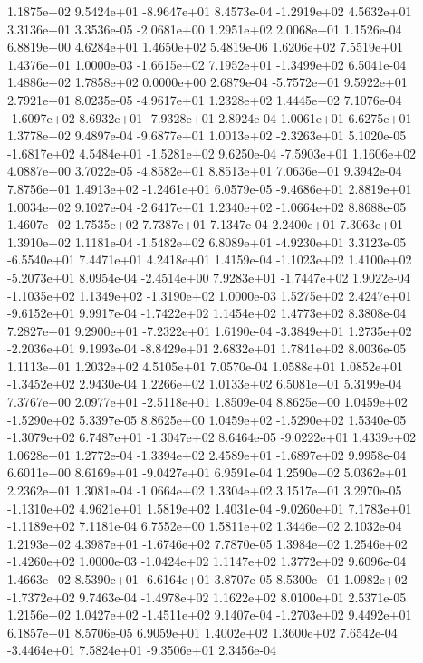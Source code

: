  1.1875e+02  9.5424e+01 -8.9647e+01  8.4573e-04
-1.2919e+02  4.5632e+01  3.3136e+01  3.3536e-05
-2.0681e+00  1.2951e+02  2.0068e+01  1.1526e-04
6.8819e+00 4.6284e+01 1.4650e+02  5.4819e-06
1.6206e+02 7.5519e+01 1.4376e+01  1.0000e-03
-1.6615e+02  7.1952e+01 -1.3499e+02  6.5041e-04
1.4886e+02 1.7858e+02 0.0000e+00  2.6879e-04
-5.7572e+01  9.5922e+01  2.7921e+01  8.0235e-05
-4.9617e+01  1.2328e+02  1.4445e+02  7.1076e-04
-1.6097e+02  8.6932e+01 -7.9328e+01  2.8924e-04
1.0061e+01 6.6275e+01 1.3778e+02  9.4897e-04
-9.6877e+01  1.0013e+02 -2.3263e+01  5.1020e-05
-1.6817e+02  4.5484e+01 -1.5281e+02  9.6250e-04
-7.5903e+01  1.1606e+02  4.0887e+00  3.7022e-05
-4.8582e+01  8.8513e+01  7.0636e+01  9.3942e-04
 7.8756e+01  1.4913e+02 -1.2461e+01  6.0579e-05
-9.4686e+01  2.8819e+01  1.0034e+02  9.1027e-04
-2.6417e+01  1.2340e+02 -1.0664e+02  8.8688e-05
1.4607e+02 1.7535e+02 7.7387e+01  7.1347e-04
2.2400e+01 7.3063e+01 1.3910e+02  1.1181e-04
-1.5482e+02  6.8089e+01 -4.9230e+01  3.3123e-05
-6.5540e+01  7.4471e+01  4.2418e+01  1.4159e-04
-1.1023e+02  1.4100e+02 -5.2073e+01  8.0954e-04
-2.4514e+00  7.9283e+01 -1.7447e+02  1.9022e-04
-1.1035e+02  1.1349e+02 -1.3190e+02  1.0000e-03
 1.5275e+02  2.4247e+01 -9.6152e+01  9.9917e-04
-1.7422e+02  1.1454e+02  1.4773e+02  8.3808e-04
 7.2827e+01  9.2900e+01 -7.2322e+01  1.6190e-04
-3.3849e+01  1.2735e+02 -2.2036e+01  9.1993e-04
-8.8429e+01  2.6832e+01  1.7841e+02  8.0036e-05
1.1113e+01 1.2032e+02 4.5105e+01  7.0570e-04
 1.0588e+01  1.0852e+01 -1.3452e+02  2.9430e-04
1.2266e+02 1.0133e+02 6.5081e+01  5.3199e-04
 7.3767e+00  2.0977e+01 -2.5118e+01  1.8509e-04
 8.8625e+00  1.0459e+02 -1.5290e+02  5.3397e-05
 8.8625e+00  1.0459e+02 -1.5290e+02  1.5340e-05
-1.3079e+02  6.7487e+01 -1.3047e+02  8.6464e-05
-9.0222e+01  1.4339e+02  1.0628e+01  1.2772e-04
-1.3394e+02  2.4589e+01 -1.6897e+02  9.9958e-04
 6.6011e+00  8.6169e+01 -9.0427e+01  6.9591e-04
1.2590e+02 5.0362e+01 2.2362e+01  1.3081e-04
-1.0664e+02  1.3304e+02  3.1517e+01  3.2970e-05
-1.1310e+02  4.9621e+01  1.5819e+02  1.4031e-04
-9.0260e+01  7.1783e+01 -1.1189e+02  7.1181e-04
6.7552e+00 1.5811e+02 1.3446e+02  2.1032e-04
 1.2193e+02  4.3987e+01 -1.6746e+02  7.7870e-05
 1.3984e+02  1.2546e+02 -1.4260e+02  1.0000e-03
-1.0424e+02  1.1147e+02  1.3772e+02  9.6096e-04
 1.4663e+02  8.5390e+01 -6.6164e+01  3.8707e-05
 8.5300e+01  1.0982e+02 -1.7372e+02  9.7463e-04
-1.4978e+02  1.1622e+02  8.0100e+01  2.5371e-05
 1.2156e+02  1.0427e+02 -1.4511e+02  9.1407e-04
-1.2703e+02  9.4492e+01  6.1857e+01  8.5706e-05
6.9059e+01 1.4002e+02 1.3600e+02  7.6542e-04
-3.4464e+01  7.5824e+01 -9.3506e+01  2.3456e-04
